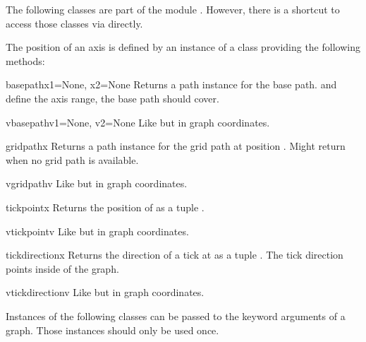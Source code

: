 The following classes are part of the module .
However, there is a shortcut to access those classes via
 directly.

The position of an axis is defined by an instance of a class providing
the following methods:

\begin{methoddesc}[axispos]{basepath}{x1=None, x2=None}
  Returns a path instance for the base path.  and 
  define the axis range, the base path should cover.
\end{methoddesc}

\begin{methoddesc}[axispos]{vbasepath}{v1=None, v2=None}
  Like  but in graph coordinates.
\end{methoddesc}

\begin{methoddesc}[axispos]{gridpath}{x}
  Returns a path instance for the grid path at position .
  Might return  when no grid path is available.
\end{methoddesc}

\begin{methoddesc}[axispos]{vgridpath}{v}
  Like  but in graph coordinates.
\end{methoddesc}

\begin{methoddesc}[axispos]{tickpoint}{x}
  Returns the position of  as a tuple .
\end{methoddesc}

\begin{methoddesc}[axispos]{vtickpoint}{v}
  Like  but in graph coordinates.
\end{methoddesc}

\begin{methoddesc}[axispos]{tickdirection}{x}
  Returns the direction of a tick at  as a tuple .
  The tick direction points inside of the graph.
\end{methoddesc}

\begin{methoddesc}[axispos]{vtickdirection}{v}
  Like  but in graph coordinates.
\end{methoddesc}

Instances of the following classes can be passed to the 
keyword arguments of a graph. Those instances should only be used once.

